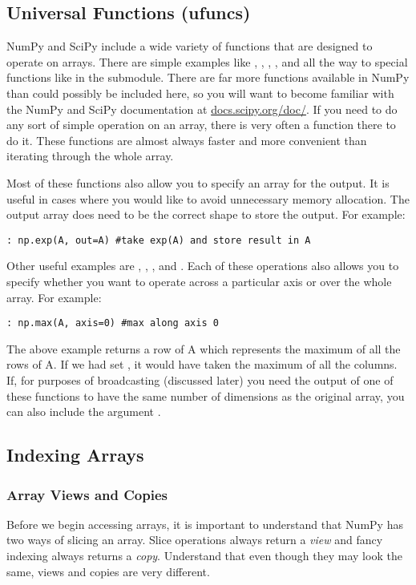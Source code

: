 \subsection*{Universal Functions (ufuncs)}
NumPy and SciPy include a wide variety of functions that are designed to operate on arrays.
There are simple examples like , , , , and  all the way to special functions like  in the  submodule.
There are far more functions available in NumPy than could possibly be included here, so you will want to become familiar with the NumPy and SciPy documentation at \url{docs.scipy.org/doc/}.
If you need to do any sort of simple operation on an array, there is very often a function there to do it.
These functions are almost always faster and more convenient than iterating through the whole array.

Most of these functions also allow you to specify an array for the output.
It is useful in cases where you would like to avoid unnecessary memory allocation.
The output array does need to be the correct shape to store the output.
For example:
\begin{lstlisting}
: np.exp(A, out=A) #take exp(A) and store result in A
\end{lstlisting}

Other useful examples are , , , and .
Each of these operations also allows you to specify whether you want to operate across a particular axis or over the whole array.
For example:
\begin{lstlisting}
: np.max(A, axis=0) #max along axis 0
\end{lstlisting}
The above example returns a row of A which represents the maximum of all the rows of A.
If we had set , it would have taken the maximum of all the columns.
If, for purposes of broadcasting (discussed later) you need the output of one of these functions to have the same number of dimensions as the original array, you can also include the argument .

\subsection*{Indexing Arrays}
\subsubsection*{Array Views and Copies}
Before we begin accessing arrays, it is important to understand that NumPy has two ways of slicing an array.
Slice operations always return a \emph{view} and fancy indexing always returns a \emph{copy}.
Understand that even though they may look the same, views and copies are very different.

